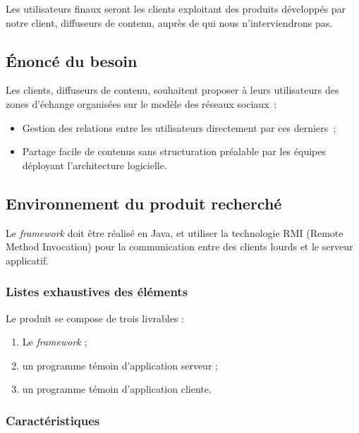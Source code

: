 Les utilisateurs finaux seront les clients exploitant des produits développés par notre client, diffuseurs de contenu, auprès de qui nous n'interviendrons pas.

\subsection{Énoncé du besoin}

Les clients, diffuseurs de contenu, souhaitent proposer à leurs utilisateurs des zones d'échange organisées sur le modèle des réseaux sociaux~:

\begin{itemize}
	\item Gestion des relations entre les utilisateurs directement par ces derniers~;
	\item Partage facile de contenus sans structuration préalable par les équipes déployant l'architecture logicielle.
\end{itemize}

\subsection{Environnement du produit recherché}

Le \textit{framework} doit être réalisé en Java, et utiliser la technologie RMI (Remote Method Invocation) pour la communication entre des clients lourds et le serveur applicatif.

\subsubsection{Listes exhaustives des éléments}

Le produit se compose de trois livrables :
\begin{enumerate}
 \item Le \textit{framework} ;
 \item un programme témoin d'application serveur ;
 \item un programme témoin d'application cliente.
\end{enumerate}

\subsubsection{Caractéristiques}

